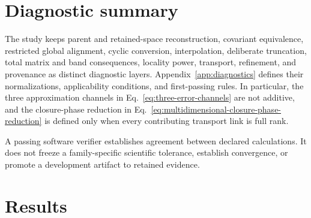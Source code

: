 \documentclass[11pt]{article}
\begin{document}
\section{Diagnostic summary}

The study keeps parent and retained-space reconstruction, covariant equivalence,
restricted global alignment, cyclic conversion, interpolation, deliberate truncation,
total matrix and band consequences, locality power, transport, refinement, and
provenance as distinct diagnostic layers. Appendix~\ref{app:diagnostics} defines their
normalizations, applicability conditions, and first-passing rules. In particular, the
three approximation channels in Eq.~\eqref{eq:three-error-channels} are not additive,
and the closure-phase reduction in
Eq.~\eqref{eq:multidimensional-closure-phase-reduction} is defined only when every
contributing transport link is full rank.

A passing software verifier establishes agreement between declared calculations. It
does not freeze a family-specific scientific tolerance, establish convergence, or
promote a development artifact to retained evidence.

\section{Results}
\end{document}
